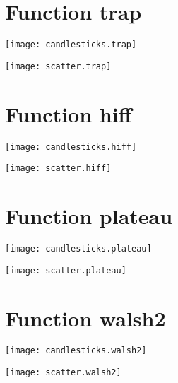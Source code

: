 \section{Function trap}
\begin{center}

\end{center}
\begin{center}
\texttt{[image: candlesticks.trap]}
\end{center}
\begin{center}
\texttt{[image: scatter.trap]}
\end{center}
\begin{center}

\end{center}
\newpage
\section{Function hiff}
\begin{center}

\end{center}
\begin{center}
\texttt{[image: candlesticks.hiff]}
\end{center}
\begin{center}
\texttt{[image: scatter.hiff]}
\end{center}
\begin{center}

\end{center}
\newpage
\section{Function plateau}
\begin{center}

\end{center}
\begin{center}
\texttt{[image: candlesticks.plateau]}
\end{center}
\begin{center}
\texttt{[image: scatter.plateau]}
\end{center}
\begin{center}

\end{center}
\newpage
\section{Function walsh2}
\begin{center}

\end{center}
\begin{center}
\texttt{[image: candlesticks.walsh2]}
\end{center}
\begin{center}
\texttt{[image: scatter.walsh2]}
\end{center}
\begin{center}

\end{center}
